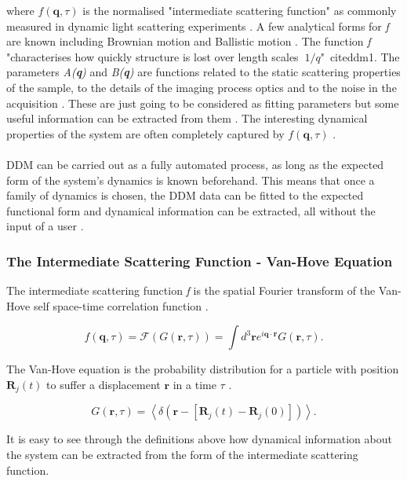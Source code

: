 \documentclass[11pt]{article}
\begin{document}
where $f(\textbf{q}, \tau)$ is the normalised "intermediate scattering function" as commonly measured in dynamic light scattering experiments \cite{DLSPecora}. A few analytical forms for \textit{f} are known including Brownian motion and Ballistic motion \cite{DLSPecora}. The function \textit{f} "characterises how quickly structure is lost over length scales $~1/q$"\ cite{ddm1}. The parameters \textit{A(\textbf{q})} and \textit{B(\textbf{q})} are functions related to the static scattering properties of the sample, to the details of the imaging process optics and to the noise in the acquisition \cite{ddm1}. These are just going to be considered as fitting parameters but some useful information can be extracted from them \cite{ddm1}. The interesting dynamical properties of the system are often completely captured by $f(\textbf{q}, \tau)$ \cite{ddm1}.
\\\\
DDM can be carried out as a fully automated process, as long as the expected form of the system's dynamics is known beforehand. This means that once a family of dynamics is chosen, the DDM data can be fitted to the expected functional form and dynamical information can be extracted, all without the input of a user \cite{ddm1}.

\subsubsection{The Intermediate Scattering Function - Van-Hove Equation}
The intermediate scattering function \textit{f} is the spatial Fourier transform of the Van-Hove self space-time correlation function \cite{DLSPecora}.

\begin{equation}
	f(\textbf{q}, \tau) = \mathscr{F} (G(\textbf{r}, \tau)) = \int d^3 \textbf{r} e^{i \textbf{q} \cdot \textbf{r}} G(\textbf{r}, \tau).
\end{equation}

The Van-Hove equation is the probability distribution for a particle with position $\textbf{R}_j(t)$ to suffer a displacement $\textbf{r}$ in a time $\tau$ \cite{DLSPecora}.

\begin{equation}
	G(\textbf{r}, \tau) = \left\langle \delta (\textbf{r} - [\textbf{R}_j(t) - \textbf{R}_j(0)]) \right\rangle.
\end{equation}

It is easy to see through the definitions above how dynamical information about the system can be extracted from the form of the intermediate scattering function.
\end{document}
